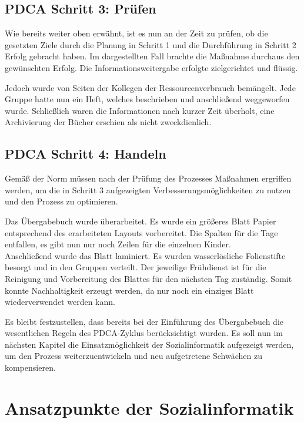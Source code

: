 \subsection{PDCA Schritt 3: Prüfen}

Wie bereits weiter oben erwähnt, ist es nun an der Zeit zu prüfen, ob die gesetzten Ziele durch die Planung in Schritt 1 und die Durchführung in Schritt 2 Erfolg gebracht haben. Im dargestellten Fall brachte die Maßnahme durchaus den gewünschten Erfolg. Die Informationsweitergabe erfolgte zielgerichtet und flüssig. 

Jedoch wurde von Seiten der Kollegen der Ressourcenverbrauch bemängelt. Jede Gruppe hatte nun ein Heft, welches beschrieben und anschließend weggeworfen wurde. Schließlich waren die Informationen nach kurzer Zeit überholt, eine Archivierung der Bücher erschien als nicht zweckdienlich.

\subsection{PDCA Schritt 4: Handeln}

Gemäß der Norm \citep[vgl.][14]{ISO9001} müssen nach der Prüfung des Prozesses Maßnahmen ergriffen werden, um die in Schritt 3 aufgezeigten Verbesserungsmöglichkeiten zu nutzen und den Prozess zu optimieren. 

Das Übergabebuch wurde überarbeitet. Es wurde ein größeres Blatt Papier entsprechend des erarbeiteten Layouts vorbereitet. Die Spalten für die Tage entfallen, es gibt nun nur noch Zeilen für die einzelnen Kinder.\\
Anschließend wurde das Blatt laminiert.
Es wurden wasserlösliche Folienstifte besorgt und in den Gruppen verteilt. Der jeweilige Frühdienst ist für die Reinigung und Vorbereitung des Blattes für den nächsten Tag zuständig. Somit konnte Nachhaltigkeit erzeugt werden, da nur noch ein einziges Blatt wiederverwendet werden kann.

Es bleibt festzustellen, dass bereits bei der Einführung des Übergabebuch die wesentlichen Regeln des PDCA-Zyklus berücksichtigt wurden. Es soll nun im nächsten Kapitel die Einsatzmöglichkeit der Sozialinformatik aufgezeigt werden, um den Prozess weiterzuentwickeln und neu aufgetretene Schwächen zu kompensieren.

\newpage
\section{Ansatzpunkte der Sozialinformatik}

